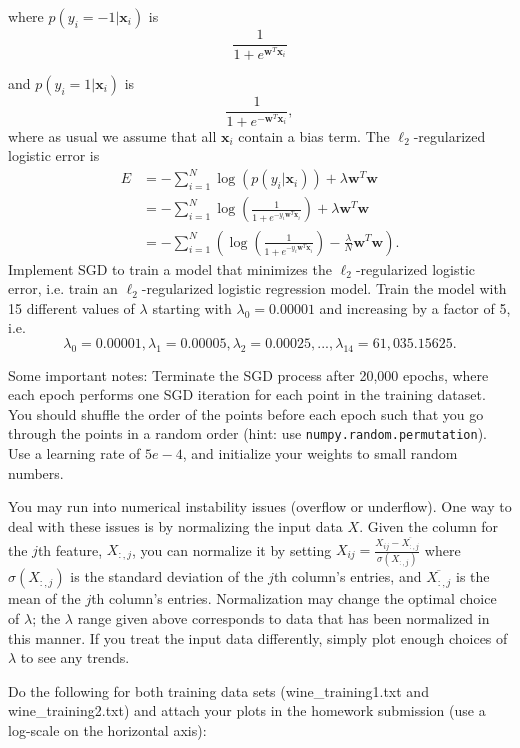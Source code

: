 where $p(y_i = -1 | \mathbf{x}_i)$ is
\[\frac{1}{1 + e^{\mathbf{w}^T\mathbf{x}_i}}\]

and $p(y_i = 1 | \mathbf{x}_i)$ is
\[\frac{1}{1 + e^{-\mathbf{w}^T\mathbf{x}_i}},\]
where as usual we assume that all $\mathbf{x}_i$ contain a bias term.
The $\ell_2$-regularized logistic error is
\begin{align*}
  E &= -\sum_{i=1}^{N}\log(p(y_i | \mathbf{x}_i)) + \lambda\mathbf{w}^T\mathbf{w} \\
    &= -\sum_{i=1}^{N} \log \left( \frac{1}{1 + e^{-y_i\mathbf{w}^T\mathbf{x}_i}} \right) + \lambda\mathbf{w}^T\mathbf{w} \\
    &= -\sum_{i=1}^{N} \left(\log \left( \frac{1}{1 + e^{-y_i\mathbf{w}^T\mathbf{x}_i}} \right) - \frac{\lambda}{N}\mathbf{w}^T\mathbf{w}\right).
\end{align*}
Implement SGD to train a model that minimizes the $\ell_2$-regularized logistic error, i.e. train an $\ell_2$-regularized logistic regression model.  Train the model with 15 different values of $\lambda$ starting with $\lambda_0 = 0.00001$ and increasing by a factor of 5, i.e. $$\lambda_0 = 0.00001, \lambda_1 = 0.00005, \lambda_2 = 0.00025, ..., \lambda_{14} = 61,035.15625.$$
\par

Some important notes: Terminate the SGD process after 20,000 epochs, where each epoch performs one SGD iteration for each point in the training dataset. You should shuffle the order of the points before each epoch such that you go through the points in a random order (hint: use \texttt{numpy.random.permutation}). Use a learning rate of $5e-4$, and initialize your weights to small random numbers.

You may run into numerical instability issues (overflow or underflow). One way to deal with these issues is by normalizing the input data $X$. Given the column for the $j$th feature, $X_{:,j}$, you can normalize it by setting $X_{ij} = \frac{X_{ij} - \overline{X_{:,j}} }{\sigma(X_{:,j})}$ where $\sigma(X_{:,j})$ is the standard deviation of the $j$th column's entries, and $\overline{X_{:,j}}$ is the mean of the $j$th column's entries. Normalization may change the optimal choice of $\lambda$; the $\lambda$ range given above corresponds to data that has been normalized in this manner. If you treat the input data differently, simply plot enough choices of $\lambda$ to see any trends.

\problem[16]
Do the following for both training data sets (wine\_training1.txt and wine\_training2.txt) and attach your plots in the homework submission (use a log-scale on the horizontal axis):

